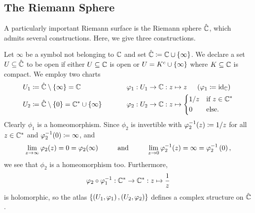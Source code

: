 \subsection{The Riemann Sphere}
A particularly important Riemann surface is the Riemann sphere $\hat{\mathbb{C}}$, which admits several constructions. Here, we give three constructions.
\begin{example}
    Let $\infty$ be a symbol not belonging to $\mathbb{C}$ and set $\hat{\mathbb{C}}\coloneqq\mathbb{C}\cup\left\{\infty\right\}$. We declare a set $U\subseteq\hat{\mathbb{C}}$ to be open if either $U\subseteq\mathbb{C}$ is open or $U=K^c\cup\left\{\infty\right\}$ where $K\subseteq\mathbb{C}$ is compact. We employ two charts
    \begin{equation*}
        \begin{alignedat}{2}
            U_1&\coloneqq\RS\comp\l\{\infty\r\}=\C\ \ \ \ \ \ \ \ \ \ \ \ \ \ \ \ \ \ \ \ &&\phi_1:U_1\to\C:z\mapsto z\ \ \ \ \l(\phi_1\coloneqq\id_\C\r) \\
            U_2&\coloneqq\RS\comp\l\{0\r\}=\C^\ast\cup\l\{\infty\r\}&&\phi_2:U_2\to\C:z\mapsto
            \begin{dcases}
                1/z & \textrm{if }z\in\C^\ast \\
                0 & \textrm{else.}
            \end{dcases}
        \end{alignedat}
    \end{equation*}
    Clearly $\phi_1$ is a homeomorphism. Since $\phi_2$ is invertible with $\varphi_2^{-1}\!\left(z\right)\coloneqq1/z$ for all $z\in\mathbb{C}^\ast$ and $\varphi_2^{-1}\!\left(0\right)\coloneqq\infty$, and
    \begin{equation*}
        \lim\limits_{z\to\infty}\phi_2\!\l(z\r)=0=\phi_2\!\l(\infty\r)\ \ \ \ \ \ \ \ \textrm{and}\ \ \ \ \ \ \ \ \lim\limits_{z\to0}\phi_2^{-1}\!\l(z\r)=\infty=\phi_2^{-1}\l(0\r),
    \end{equation*}
    we see that $\phi_2$ is a homeomorphism too. Furthermore,
    \begin{equation*}
        \varphi_2\circ\varphi_1^{-1}:\mathbb{C}^\ast\to\mathbb{C}^\ast:z\mapsto\frac{1}{z}
    \end{equation*}
    is holomorphic, so the atlas $\left\{\left(U_1,\varphi_1\right),\left(U_2,\varphi_2\right)\right\}$ defines a complex structure on $\hat{\mathbb{C}}$.\exqed
\end{example}
